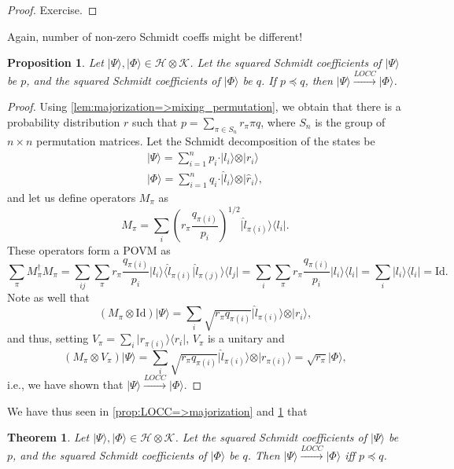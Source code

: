 \documentclass{article}
\newtheorem{proposition}{Proposition}
\newtheorem{theorem}{Theorem}
\theoremstyle{definition}
\newcommand{\id}{\mathrm{Id}}
\newcommand{\ket}[1]{\vert #1 \rangle}
\newcommand{\bra}[1]{\langle #1 \vert}
\newcommand{\scalprod}[2]{\langle #1 \vert #2 \rangle}
\begin{document}
\begin{proof}
  Exercise.
\end{proof}

{\color{red} Again, number of non-zero Schmidt coeffs might be different!}
\begin{proposition}\label{prop:majorization=>LOCC}
  Let $\ket{\Psi},\ket{\Phi}\in \mathcal{H}\otimes \mathcal{K}$. Let the squared Schmidt coefficients of $\ket{\Psi}$ be $p$, and the squared Schmidt coefficients of $\ket{\Phi}$ be $q$. If $p\preccurlyeq q$, then $\ket{\Psi}\xrightarrow{LOCC}\ket{\Phi}$. 
\end{proposition}

\begin{proof}
  Using \cref{lem:majorization=>mixing_permutation}, we obtain that there is a probability distribution $r$ such that $p  = \sum_{\pi \in S_n} r_{\pi} \pi q$, where $S_n$ is the group of $n\times n$ permutation matrices. Let the Schmidt decomposition of the states be 
  \begin{align*}
    \ket{\Psi} = \sum_{i=1}^n p_i \cdot \ket{l_i} \otimes \ket{r_i}\\
    \ket{\Phi} = \sum_{i=1}^n q_i \cdot \ket{\hat{l}_i} \otimes \ket{\hat{r}_i},    
  \end{align*}
  and let us define operators $M_{\pi}$ as 
  \begin{equation*}
    M_{\pi} = \sum_i \left( r_\pi \frac{q_{\pi(i)}}{p_i}\right)^{1/2} \ket{\hat{l}_{\pi(i)}} \bra{l_i}. 
  \end{equation*}
  These operators form a POVM as
  \begin{equation*}
    \sum_{\pi} M_\pi^\dagger M_\pi = \sum_{ij}\sum_\pi  r_\pi \frac{q_{\pi(i)}}{p_i} \ket{l_i}\scalprod{\hat{l}_{\pi(i)}}{\hat{l}_{\pi(j)}}\bra{l_j} = \sum_{i}\sum_\pi  r_\pi \frac{q_{\pi(i)}}{p_i} \ket{l_i}\bra{l_i}  = \sum_{i} \ket{l_i}\bra{l_i}  = \id.
  \end{equation*}
  Note as well that 
  \begin{equation*}
    (M_\pi \otimes \id) \ket{\Psi} = \sum_i  \sqrt{r_\pi q_{\pi(i)}} \ket{\hat{l}_{\pi(i)}}\otimes \ket{r_i}, 
  \end{equation*}
  and thus, setting $V_{\pi} = \sum_i \ket{r_{\pi(i)}}\bra{r_i}$, $V_\pi$ is a unitary and 
  \begin{equation*}
    (M_\pi \otimes V_\pi) \ket{\Psi} = \sum_i  \sqrt{r_\pi q_{\pi(i)}} \ket{\hat{l}_{\pi(i)}}\otimes \ket{r_{\pi(i)}} = \sqrt{r_\pi} \ket{\Phi}, 
  \end{equation*}
  i.e., we have shown that $\ket{\Psi}\xrightarrow{LOCC}\ket{\Phi}$.
\end{proof}

We have thus seen in \cref{prop:LOCC=>majorization} and \cref{prop:majorization=>LOCC} that
\begin{theorem}
  Let $\ket{\Psi},\ket{\Phi}\in \mathcal{H}\otimes \mathcal{K}$. Let the squared Schmidt coefficients of $\ket{\Psi}$ be $p$, and the squared Schmidt coefficients of $\ket{\Phi}$ be $q$. Then $\ket{\Psi}\xrightarrow{LOCC}\ket{\Phi}$ iff  $p\preccurlyeq q$.   
\end{theorem}
\end{document}
